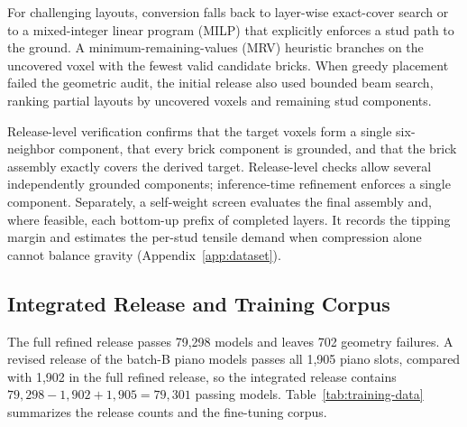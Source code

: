 For challenging layouts, conversion falls back to layer-wise exact-cover search or to a mixed-integer linear program (MILP) that explicitly enforces a stud path to the ground. A minimum-remaining-values (MRV) heuristic branches on the uncovered voxel with the fewest valid candidate bricks. When greedy placement failed the geometric audit, the initial release also used bounded beam search, ranking partial layouts by uncovered voxels and remaining stud components.

Release-level verification confirms that the target voxels form a single six-neighbor component, that every brick component is grounded, and that the brick assembly exactly covers the derived target. Release-level checks allow several independently grounded components; inference-time refinement enforces a single component. Separately, a self-weight screen evaluates the final assembly and, where feasible, each bottom-up prefix of completed layers. It records the tipping margin and estimates the per-stud tensile demand when compression alone cannot balance gravity (Appendix~\ref{app:dataset}).

\subsection{Integrated Release and Training Corpus}
The full refined release passes 79,298 models and leaves 702 geometry failures. A revised release of the batch-B piano models passes all 1,905 piano slots, compared with 1,902 in the full refined release, so the integrated release contains $79{,}298-1{,}902+1{,}905=79{,}301$ passing models. Table~\ref{tab:training-data} summarizes the release counts and the fine-tuning corpus.

